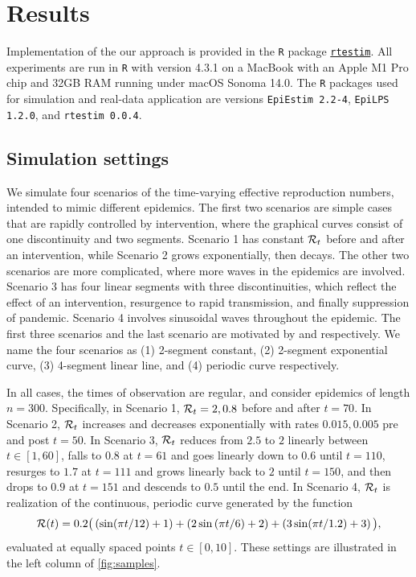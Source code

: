 \section{Results}

Implementation of the our approach is provided in the \texttt{R} package
\href{https://dajmcdon.github.io/rtestim/}{\texttt{rtestim}}. All experiments
are run in \texttt{R} with version 4.3.1 on a MacBook with an Apple M1 Pro chip
and 32GB RAM running under macOS Sonoma 14.0. The \texttt{R} packages used for
simulation and real-data application are versions \texttt{EpiEstim 2.2-4},
\texttt{EpiLPS 1.2.0}, and \texttt{rtestim 0.0.4}. 

\subsection{Simulation settings}

We simulate four scenarios of the time-varying effective reproduction numbers,
intended to mimic different epidemics. The first two scenarios are simple cases
that are rapidly controlled by intervention, where the graphical curves consist
of one discontinuity and two segments. Scenario 1 has constant $\mathcal{R}_t$ before
and after an intervention, while Scenario 2 grows exponentially, then decays.
The other two scenarios are more complicated, where more waves in the epidemics
are involved. Scenario 3 has four linear segments with three discontinuities,
which reflect the effect of an intervention, resurgence to rapid transmission,
and finally suppression of pandemic. Scenario 4 involves sinusoidal waves
throughout the epidemic.
The first three scenarios and the last scenario are motivated by
\citet{parag2021improved} and \citet{gressani2022epilps} respectively. 
We name the four scenarios as (1) 2-segment constant, (2) 2-segment exponential 
curve, (3) 4-segment linear line, and (4) periodic curve respectively. 

In all cases, the times of observation are regular, and consider epidemics of
length $n=300$. Specifically, in Scenario 1, $\mathcal{R}_t = 2, 0.8$ before and after
$t=70$. In Scenario 2, $\mathcal{R}_t$ increases and decreases exponentially with
rates $0.015, 0.005$ pre and post $t=50$. In Scenario 3, $\mathcal{R}_t$ reduces from
$2.5$ to $2$ linearly between $t\in[1,60]$, falls to $0.8$ at $t=61$ and goes
linearly down to $0.6$ until $t=110$, resurges to $1.7$ at $t=111$ and grows
linearly back to $2$ until $t=150$, and then drops to $0.9$ at $t=151$ and
descends to $0.5$ until the end. In Scenario 4, $\mathcal{R}_t$ is realization of the
continuous, periodic curve generated by the function $$\mathcal{R}(t) = 0.2 \big(
\left(\sin(\pi t/12) + 1\right) + \left(2 \sin\left(\pi t / 6\right) + 2\right) + \left(3
\sin(\pi t / 1.2) + 3\right)\big),$$ evaluated at equally spaced points $t\in [0,10]$. These
settings are illustrated in the left column of \autoref{fig:samples}.


